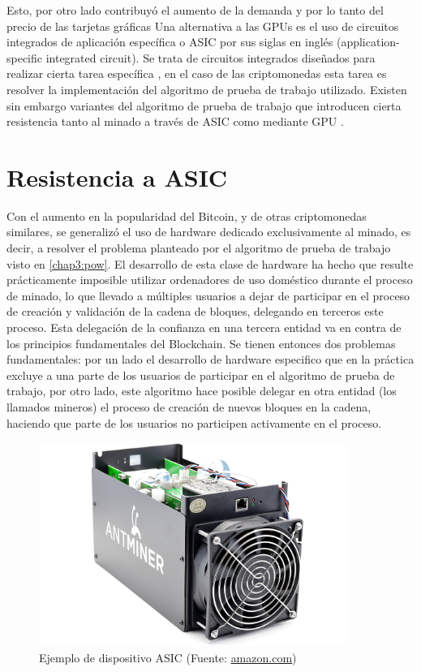 Esto, por otro lado contribuyó el aumento de la demanda y por lo tanto del precio de las tarjetas gráficas\citep{gpu_price}
Una alternativa a las GPUs es el uso de circuitos integrados de aplicación específica o ASIC por sus siglas en inglés (application-specific integrated circuit). Se trata de circuitos integrados diseñados para realizar cierta tarea específica \citep{asic_def}, en el caso de las criptomonedas esta tarea es resolver la implementación del algoritmo de prueba de trabajo utilizado. Existen sin embargo variantes del algoritmo de prueba de trabajo que introducen cierta resistencia tanto al minado a través de ASIC como mediante GPU \citep{asic_res}.

\section{Resistencia a ASIC} \label{cap3:asic}

Con el aumento en la popularidad del Bitcoin, y de otras criptomonedas similares, se generalizó el uso de hardware dedicado exclusivamente al minado, es decir, a resolver el problema planteado por el algoritmo de prueba de trabajo visto en \ref{chap3:pow}. El desarrollo de esta clase de hardware ha hecho que resulte prácticamente imposible utilizar ordenadores de uso doméstico durante el proceso de minado, lo que llevado a múltiples usuarios a dejar de participar en el proceso de creación y validación de la cadena de bloques, delegando en terceros este proceso. Esta delegación de la confianza en una tercera entidad va en contra de los principios fundamentales del Blockchain. Se tienen entonces dos problemas fundamentales: por un lado el desarrollo de hardware especifico que en la práctica excluye a una parte de los usuarios de participar en el algoritmo de prueba de trabajo, por otro lado, este algoritmo hace posible delegar en otra entidad (los llamados mineros) el proceso de creación de nuevos bloques en la cadena, haciendo que parte de los usuarios no participen activamente en el proceso.


\begin{figure}[H]
  \begin{center}
  \includegraphics[width=10cm]{figures/asic.jpg}
  \end{center}
  \caption{Ejemplo de dispositivo ASIC (Fuente: \url{amazon.com})}%

	\label{fig:asic}%
\end{figure}

